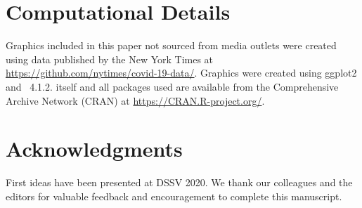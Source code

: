 \documentclass[article]{jdssv}\usepackage[]{graphicx}\usepackage[]{xcolor}
\begin{document}
\newpage
\section*{Computational Details}
Graphics included in this paper not sourced from media outlets were created using data published by the New York Times at \url{https://github.com/nytimes/covid-19-data/}. Graphics were created using ggplot2\citep{ggplot2} and ~4.1.2.  itself and all packages used are available from the Comprehensive  Archive Network (CRAN) at \url{https://CRAN.R-project.org/}.

\section*{Acknowledgments}

First ideas have been presented at DSSV 2020. We thank our colleagues and the editors for valuable feedback and encouragement to complete this manuscript.





% 
% 
% 
% 
% 

\end{document}
